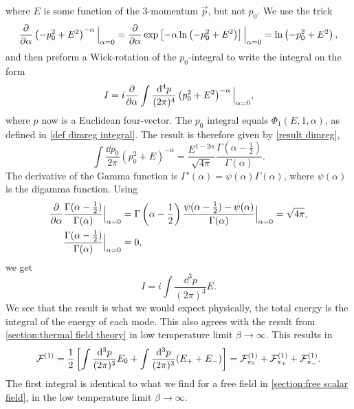 where $E$ is some function of the 3-momentum $\vec p$, but not $p_0$.
We use the trick
\begin{equation}
    \pdv{\alpha} \left(-p_0^2 + E^2\right)^{-\alpha} \Big|_{\alpha=0}
    = \pdv{\alpha} \exp\left[ -\alpha \ln\left(- p_0^2 + E^2\right)  \right] \Big|_{\alpha=0}
    = \ln\left(- p_0^2 + E^2\right),
\end{equation}
and then preform a Wick-rotation of the $p_0$-integral to write the integral on the form
\begin{equation}
    I = i \pdv{\alpha} \int \frac{\dd^4 p}{(2 \pi)^4} \left(p_0^2 + E^2\right)^{-\alpha} \Big|_{\alpha=0},
\end{equation}
where $p$ now is a Euclidean four-vector.
The $p_0$ integral equals $\Phi_1(E, 1, \alpha)$, as defined in \autoref{def dimreg integral}. 
The result is therefore given by \autoref{result dimreg},
\begin{equation}
    \int \frac{\dd p_0}{2 \pi} (p_0^2 + E)^{-\alpha} 
    = \frac{E^{1-2\alpha}}{\sqrt{4 \pi}} \frac{\Gamma(\alpha-\frac{1}{2})}{\Gamma(\alpha)}.
\end{equation}
The derivative of the Gamma function is $\Gamma'(\alpha) = \psi(\alpha)\Gamma(\alpha)$, where $\psi(\alpha)$ is the digamma function.
Using
\begin{align}
    \diffp{}{\alpha} & \frac{\Gamma(\alpha - \frac{1}{2}) }{\Gamma(\alpha)} \Big|_{\alpha=0}
    = \Gamma\left(\alpha - \frac{1}{2}\right) \frac{\psi(\alpha - \frac{1}{2}) - \psi(\alpha)}{\Gamma(\alpha)} \Big|_{\alpha=0}
    = \sqrt{4 \pi}, \\
    & \frac{\Gamma(\alpha - \frac{1}{2}) }{\Gamma(\alpha)}\Big|_{\alpha=0} = 0,
\end{align}
we get
\begin{equation}
    I = i \int \frac{\dd^3 p}{(2 \pi)^3} E.
\end{equation}
We see that the result is what we would expect physically, the total energy is the integral of the energy of each mode.
This also agrees with the result from \autoref{section:thermal field theory} in low temperature limit $\beta \rightarrow \infty$.
This results in 
\begin{equation}
    \mathcal{F}^{(1)} = 
    \frac{1}{2} 
    \left[\int \frac{\dd^3 p}{(2\pi)^3} E_0 + \int  \frac{\dd^3 p}{(2\pi)^3} (E_+ + E_-)\right]
    = \mathcal{F}^{(1)}_{\pi_0} +\mathcal{F}^{(1)}_{\pi_+} + \mathcal{F}^{(1)}_{\pi_-}.
\end{equation}
The first integral is identical to what we find for a free field in \autoref{section:free scalar field}, in the low temperature limit $\beta \rightarrow \infty$.
